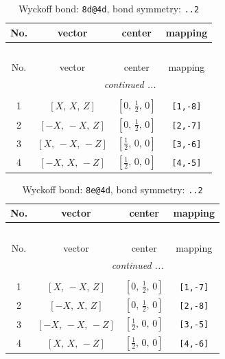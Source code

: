 \documentclass[fleqn,8pt]{jsarticle}
\begin{document}
\begin{longtable}{cccc}
\caption{Wyckoff bond: {\tt 8d@4d}, bond symmetry: {\tt ..2}}
 \\
 \hline \hline
No. & vector & center & mapping \\ \hline \endfirsthead

\multicolumn{3}{l}{\tablename\ \thetable{}} \\
 \hline \hline
No. & vector & center & mapping \\ \hline \endhead

 \hline \hline
\multicolumn{3}{r}{\footnotesize\it continued ...} \\ \endfoot

 \hline \hline
\multicolumn{3}{r}{} \\ \endlastfoot

1 & $\left[ X,\, X,\, Z \right]$ & $\left[ 0,\, \frac{1}{2},\, 0 \right]$ & {\tt [1,-8]} \\ \hline
2 & $\left[ - X,\, - X,\, Z \right]$ & $\left[ 0,\, \frac{1}{2},\, 0 \right]$ & {\tt [2,-7]} \\ \hline
3 & $\left[ X,\, - X,\, - Z \right]$ & $\left[ \frac{1}{2},\, 0,\, 0 \right]$ & {\tt [3,-6]} \\ \hline
4 & $\left[ - X,\, X,\, - Z \right]$ & $\left[ \frac{1}{2},\, 0,\, 0 \right]$ & {\tt [4,-5]} \\
\end{longtable}
\renewcommand{\arraystretch}{1.2}
\begin{longtable}{cccc}
\caption{Wyckoff bond: {\tt 8e@4d}, bond symmetry: {\tt ..2}}
 \\
 \hline \hline
No. & vector & center & mapping \\ \hline \endfirsthead

\multicolumn{3}{l}{\tablename\ \thetable{}} \\
 \hline \hline
No. & vector & center & mapping \\ \hline \endhead

 \hline \hline
\multicolumn{3}{r}{\footnotesize\it continued ...} \\ \endfoot

 \hline \hline
\multicolumn{3}{r}{} \\ \endlastfoot

1 & $\left[ X,\, - X,\, Z \right]$ & $\left[ 0,\, \frac{1}{2},\, 0 \right]$ & {\tt [1,-7]} \\ \hline
2 & $\left[ - X,\, X,\, Z \right]$ & $\left[ 0,\, \frac{1}{2},\, 0 \right]$ & {\tt [2,-8]} \\ \hline
3 & $\left[ - X,\, - X,\, - Z \right]$ & $\left[ \frac{1}{2},\, 0,\, 0 \right]$ & {\tt [3,-5]} \\ \hline
4 & $\left[ X,\, X,\, - Z \right]$ & $\left[ \frac{1}{2},\, 0,\, 0 \right]$ & {\tt [4,-6]} \\
\end{longtable}
\end{document}
